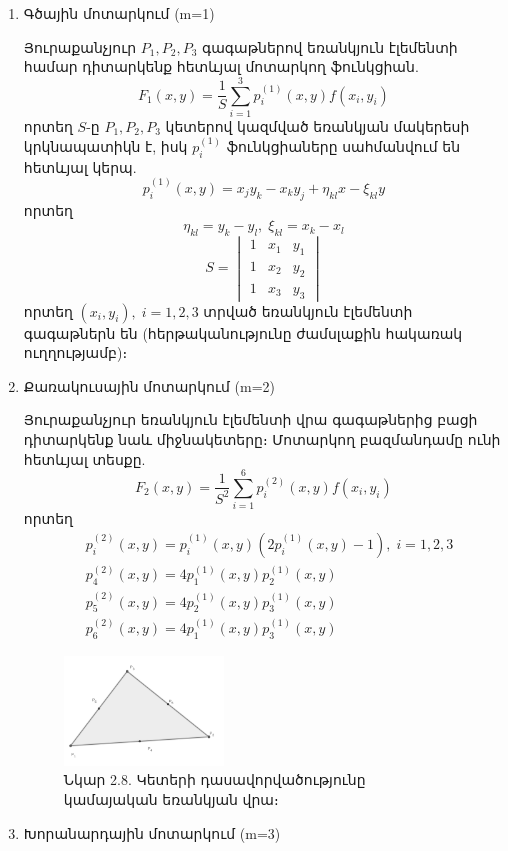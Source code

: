 \documentclass[fleqn, bachelor,subf,12pt,notitlepage]{article}
\begin{document}

\begin{enumerate}[leftmargin=0.0cm]
\item{Գծային մոտարկում (m=1)}

Յուրաքանչյուր $P_{1}, P_{2}, P_{3}$ գագաթներով եռանկյուն էլեմենտի համար դիտարկենք հետևյալ մոտարկող ֆունկցիան.
\begin{equation}
F_{1}(x, y) = \dfrac{1}{S}\sum_{i=1}^{3} p^{(1)}_{i}(x,y)f(x_{i}, y_{i})
\end{equation}
որտեղ $S$-ը $P_{1}, P_{2}, P_{3}$ կետերով կազմված եռանկյան մակերեսի կրկնապատիկն է, իսկ $p^{(1)}_{i}$ ֆունկցիաները սահմանվում են հետևյալ կերպ.
\begin{equation}
p^{(1)}_{i}(x,y) = x_{j}y_{k}-x_{k}y_{j} + \eta_{kl}x - \xi_{kl}y
\end{equation}
որտեղ
			$$\eta_{kl}=y_{k}-y_{l},\; \xi_{kl} = x_{k}-x_{l}$$
$$S = \begin{vmatrix}
     1 & x_1 & y_1\\ 
     1 & x_2 & y_2\\
     1 & x_3 & y_3 
\end{vmatrix}$$
որտեղ $(x_{i}, y_{i}), \; i=1, 2, 3$ տրված եռանկյուն էլեմենտի գագաթներն են (հերթականությունը ժամսլաքին հակառակ ուղղությամբ)։
\item{Քառակուսային մոտարկում (m=2)}

Յուրաքանչյուր եռանկյուն էլեմենտի վրա գագաթներից բացի դիտարկենք նաև միջնակետերը։ Մոտարկող բազմանդամը ունի հետևյալ տեսքը.
\begin{equation}
F_{2}(x, y) = \dfrac{1}{S^{2}}\sum_{i=1}^{6} p^{(2)}_{i}(x,y)f(x_{i}, y_{i})
\end{equation}
որտեղ 
\begin{equation}
\begin{aligned}
&p^{(2)}_{i}(x,y) = p^{(1)}_{i}(x,y)\left(2 p^{(1)}_{i}(x,y)-1\right), \; i = 1, 2, 3 \\
&p^{(2)}_{4}(x,y) =  4p^{(1)}_{1}(x,y)p^{(1)}_{2}(x,y) \\
&p^{(2)}_{5}(x,y) =  4p^{(1)}_{2}(x,y)p^{(1)}_{3}(x,y) \\
&p^{(2)}_{6}(x,y) =  4p^{(1)}_{1}(x,y)p^{(1)}_{3}(x,y)
\end{aligned}
\end{equation}
\begin{figure}[H]
\centering
\includegraphics[width=0.4\textwidth]{images/quadratic_on_triangular}
\captionsetup{labelformat=empty}
\caption{Նկար 2.8. Կետերի դասավորվածությունը կամայական եռանկյան վրա։}
\end{figure}
\item{Խորանարդային մոտարկում (m=3)}


\end{enumerate}
\end{document}
